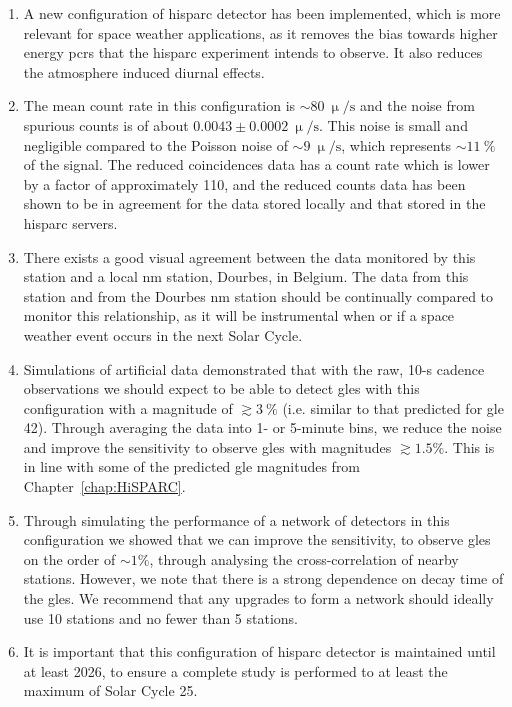 \begin{enumerate}
	\item{A new configuration of \gls{hisparc} detector has been implemented, which is more relevant for space weather applications, as it removes the bias towards higher energy \glspl{pcr} that the \gls{hisparc} experiment intends to observe. It also reduces the atmosphere induced diurnal effects.}%

	\item{The mean count rate in this configuration is $\sim80~\upmu/\mathrm{s}$ and the noise from spurious counts is of about $0.0043\pm0.0002~\upmu/\mathrm{s}$. This noise is small and negligible compared to the Poisson noise of $\sim9~\upmu/\mathrm{s}$, which represents $\sim11~\%$ of the signal. The reduced coincidences data has a count rate which is lower by a factor of approximately 110, and the reduced counts data has been shown to be in agreement for the data stored locally and that stored in the \gls{hisparc} servers.}
	
	\item{There exists a good visual agreement between the data monitored by this station and a local \gls{nm} station, Dourbes, in Belgium. The data from this station and from the Dourbes \gls{nm} station should be continually compared to monitor this relationship, as it will be instrumental when or if a space weather event occurs in the next Solar Cycle.}
	
	\item{Simulations of artificial data demonstrated that with the raw, 10-s cadence observations we should expect to be able to detect \glspl{gle} with this configuration with a magnitude of $\gtrsim3~\%$ (i.e. similar to that predicted for \gls{gle} 42). Through averaging the data into 1- or 5-minute bins, we reduce the noise and improve the sensitivity to observe \glspl{gle} with magnitudes $\gtrsim1.5 \%$. This is in line with some of the predicted \gls{gle} magnitudes from Chapter~\ref{chap:HiSPARC}.}
	
	\item{Through simulating the performance of a network of detectors in this configuration we showed that we can improve the sensitivity, to observe \glspl{gle} on the order of $\sim 1 \%$, through analysing the cross-correlation of nearby stations. However, we note that there is a strong dependence on decay time of the \glspl{gle}. We recommend that any upgrades to form a network should ideally use 10 stations and no fewer than 5 stations.}
	
	\item{It is important that this configuration of \gls{hisparc} detector is maintained until at least 2026, to ensure a complete study is performed to at least the maximum of Solar Cycle 25.}
\end{enumerate}